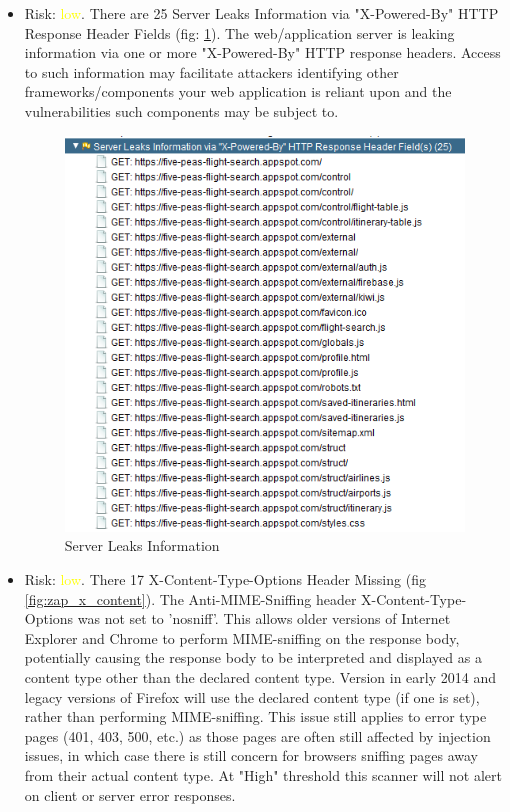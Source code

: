 \documentclass[12pt, a4paper]{article}
\begin{document}
\begin{itemize}
    \item Risk: \textcolor{yellow}{low}.  There are 25 Server Leaks Information via "X-Powered-By" HTTP Response Header Fields (fig: \ref{fig:zap_server_leak}). The web/application server is leaking information via one or more "X-Powered-By" HTTP response headers. Access to such information may facilitate attackers identifying other frameworks/components your web application is reliant upon and the vulnerabilities such components may be subject to.
    \begin{figure}[ht]
    \centering
    \includegraphics[width=\textwidth, frame]{zap_server_leak.png}
    \caption{Server Leaks Information}
    \label{fig:zap_server_leak}
    \end{figure}
    
    \item Risk: \textcolor{yellow}{low}. There 17 X-Content-Type-Options Header Missing (fig \ref{fig:zap_x_content}). 
    The Anti-MIME-Sniffing header X-Content-Type-Options was not set to 'nosniff'. This allows older versions of Internet Explorer and Chrome to perform MIME-sniffing on the response body, potentially causing the response body to be interpreted and displayed as a content type other than the declared content type. Version in early 2014 and legacy versions of Firefox will use the declared content type (if one is set), rather than performing MIME-sniffing.
    This issue still applies to error type pages (401, 403, 500, etc.) as those pages are often still affected by injection issues, in which case there is still concern for browsers sniffing pages away from their actual content type. At "High" threshold this scanner will not alert on client or server error responses.
    

\end{itemize}
\end{document}
